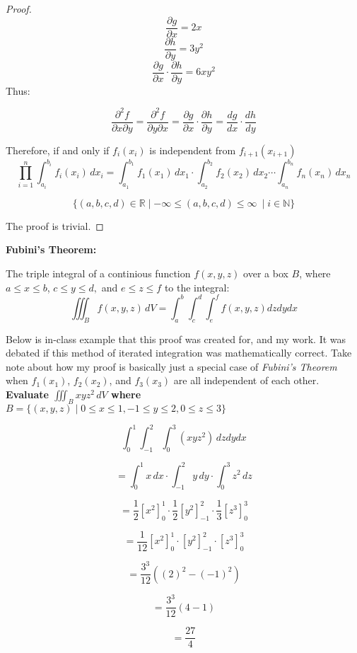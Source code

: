 \documentclass{article}
\begin{document}
\begin{proof}
\[\frac{\partial g}{\partial x} = 2x\]
\[\frac{\partial h}{\partial y} = 3y^{2}\]
\[\frac{\partial g}{\partial x} \cdot \frac{\partial h}{\partial y} = 6xy^{2}\]
Thus:

\[
    \frac{\partial^2 f}{\partial x \partial y} = \frac{\partial^2 f}{\partial y \partial x} = \frac{\partial g}{\partial x} \cdot \frac{\partial h}{\partial y} = \frac{dg}{dx} \cdot \frac{dh}{dy}
\]

Therefore, if and only if $f_i(x_i)$ is independent from $f_{i+1}(x_{i+1})$
\[
\prod_{i=1}^n \int_{a_i}^{b_i} f_i(x_i) \, dx_i = \int_{a_1}^{b_1} f_1(x_1) \, dx_1 \cdot \int_{a_2}^{b_2} f_2(x_2) \, dx_2 \cdots \int_{a_n}^{b_n} f_n(x_n) \, dx_n
\]

\[
    \{(a, b, c, d) \in \mathbb{R} \mid - \infty \le (a, b, c, d) \le \infty \ \mid i \in \mathbb{N}\}
\]

The proof is trivial.

\end{proof}

\newpage

\textbf{Fubini's Theorem:}

The triple integral of a continious function \( f(x, y, z) \) over a box \( B \), where $a \leq x \leq b$, $c \leq y \leq d,$ and $e \leq z \leq f$ to the integral:
\[
    \iiint_B f(x, y, z) \, dV = \int_{a}^{b} \int_{c}^{d} \int_{e}^{f}f(x,y,z)dzdydx
\]

Below is in-class example that this proof was created for, and my work. It was debated if this method of iterated integration was mathematically correct.
Take note about how my proof is basically just a special case of \textit{Fubini's Theorem} when  $f_1(x_1)$, $f_{2}(x_{2})$, and $f_{3}(x_{3})$ are all independent of each other.\\

\textbf{Evaluate $\iiint_B xyz^{2} \, dV$ where $ B = \{(x,y,z) \mid  0 \leq x \leq 1, -1 \leq y \leq 2, 0 \leq z \leq 3\}$}

\[
    \int_{0}^{1} \int_{-1}^{2} \int_{0}^{3}(xyz^{2}) \, dzdydx
\]

\[
    = \int_{0}^{1}x \, dx \cdot \int_{-1}^{2}y \, dy \cdot \int_{0}^{3}z^{2} \, dz
\]

\[
    = \frac{1}{2}[x^{2}]_{0}^{1} \cdot \frac{1}{2}[y^{2}]_{-1}^{2} \cdot \frac{1}{3}[z^{3}]_{0}^{3}
\]

\[
    = \frac{1}{12}[x^{2}]_{0}^{1} \cdot [y^{2}]_{-1}^{2} \cdot [z^{3}]_{0}^{3}
\]

\[
    = \frac{3^{3}}{12}((2)^{2}-(-1)^{2})
\]

\[
    = \frac{3^{3}}{12}(4-1)
\]


\[
    = \frac{27}{4}
\] 
\end{document}
